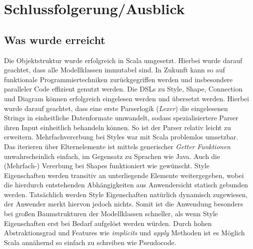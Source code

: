 \section{Schlussfolgerung/Ausblick}
\subsection{Was wurde erreicht}
Die Objektstruktur wurde erfolgreich in Scala umgesetzt. Hierbei wurde darauf geachtet, dass alle Modellklassen immutabel sind. In Zukunft kann so auf funktionale Programmiertechniken zurückgegriffen werden und insbesondere paralleler Code effizient genutzt werden. Die DSLs zu Style, Shape, Connection und Diagram können erfolgreich eingelesen werden und übersetzt werden. Hierbei wurde darauf geachtet, dass eine erste Parserlogik (\textit{Lexer}) die eingelesenen Strings in einheitliche Datenformate umwandelt, sodass spezialisiertere Parser ihren Input einheitlich behandeln können. So ist der Parser relativ leicht zu erweitern. Mehrfachvererbung bei Styles war mit Scala problemlos umsetzbar. Das iterieren über Elternelemente ist mittels generischer \textit{Getter Funktionen} unwahrscheinlich einfach, im Gegensatz zu Sprachen wie Java. Auch die (Mehrfach-) Vererbung bei Shapes funktioniert wie gewünscht. Style Eigenschaften werden transitiv an unterliegende Elemente weitergegeben, wobei die hierdurch entstehenden Abhängigkeiten aus Anwendersicht statisch gebunden werden. Tatsächlich werden Style Eigenschaften natürlich dynamisch zugewiesen, der Anwender merkt hiervon jedoch nichts. Somit ist die Anwendung besonders bei großen Baumstrukturen der Modellklassen schneller, als wenn Style Eigenschaften erst bei Bedarf aufgelöst werden würden. Durch hohen Abstraktionsgrad und Features wie \textit{implicits} und \textit{apply} Methoden ist es Möglich Scala annähernd so einfach zu schreiben wie Pseudocode.
